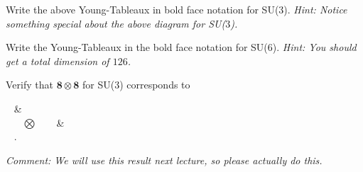 \bbox 
    Write the above Young-Tableaux in bold face notation for SU($3$). \textit{Hint: Notice something special about the above diagram for SU($3$).}
\ebox 

\bbox 
    Write the Young-Tableaux  in the bold face notation for SU(6). \textit{Hint: You should get a total dimension of $126$.}
\ebox  

\bbox 
    Verify that $\mathbf{8}\otimes \mathbf{8}$ for SU($3$) corresponds to 
    \begin{center}
        \byt 
            ~ & \\
            ~ 
        \eyt ~ $\bigotimes$ ~ \byt 
            ~ & \\
            ~ 
        \eyt.
    \end{center}
    \textit{Comment: We will use this result next lecture, so please actually do this.}
\ebox 